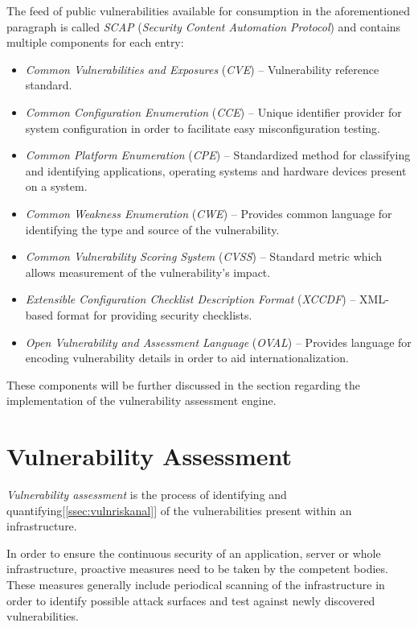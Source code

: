 \documentclass[a4paper,12pt]{article}
\begin{document}
	The feed of public vulnerabilities available for consumption in the aforementioned paragraph is called \textit{SCAP} (\textit{Security Content Automation Protocol}) and contains multiple components for each entry:
	
	\vspace{-0.15in}
	\begin{itemize}
		\item \textit{Common Vulnerabilities and Exposures} (\textit{CVE}) -- Vulnerability reference standard.
		\item \textit{Common Configuration Enumeration} (\textit{CCE}) -- Unique identifier provider for system configuration in order to facilitate easy misconfiguration testing.
		\item \textit{Common Platform Enumeration} (\textit{CPE}) -- Standardized method for classifying and identifying applications, operating systems and hardware devices present on a system.
		\item \textit{Common Weakness Enumeration} (\textit{CWE}) -- Provides common language for identifying the type and source of the vulnerability.
		\item \textit{Common Vulnerability Scoring System} (\textit{CVSS}) -- Standard metric which allows measurement of the vulnerability's impact.
		\item \textit{Extensible Configuration Checklist Description Format} (\textit{XCCDF}) -- XML-based format for providing security checklists.
		\item \textit{Open Vulnerability and Assessment Language} (\textit{OVAL}) -- Provides language for encoding vulnerability details in order to aid internationalization.
	\end{itemize}
	\vspace{-0.15in}
	
	These components will be further discussed in the section regarding the implementation of the vulnerability assessment engine.
	
\newpage
\section{Vulnerability Assessment}
	
	\textit{Vulnerability assessment} is the process of identifying and quantifying[\ref{ssec:vulnriskanal}] of the vulnerabilities present within an infrastructure.
	
	In order to ensure the continuous security of an application, server or whole infrastructure, proactive measures need to be taken by the competent bodies. These measures generally include periodical scanning of the infrastructure in order to identify possible attack surfaces and test against newly discovered vulnerabilities.
	
\end{document}
